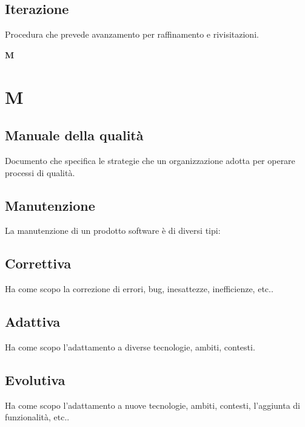 	\subsection{Iterazione}
	\label{sec:iterazione}
	Procedura che prevede avanzamento per raffinamento e rivisitazioni.\newpage

	{\Huge{\textbf{M}}} \\
	\section{M}
	
	\subsection{Manuale della qualità}
	\label{sec:manualequalita}
	Documento che specifica le strategie che un organizzazione adotta per operare processi di qualità.
	
	
	\subsection{Manutenzione}
	\label{sec:manutenzione}
	La manutenzione di un prodotto software è di diversi tipi:
		
		\subsection{Correttiva}
		Ha come scopo la correzione di errori, bug, inesattezze, inefficienze, etc..
		
		\subsection{Adattiva}
		Ha come scopo l'adattamento a diverse tecnologie, ambiti, contesti.
		
		\subsection{Evolutiva}
		Ha come scopo l'adattamento a nuove tecnologie, ambiti, contesti, l'aggiunta di funzionalità, etc..

